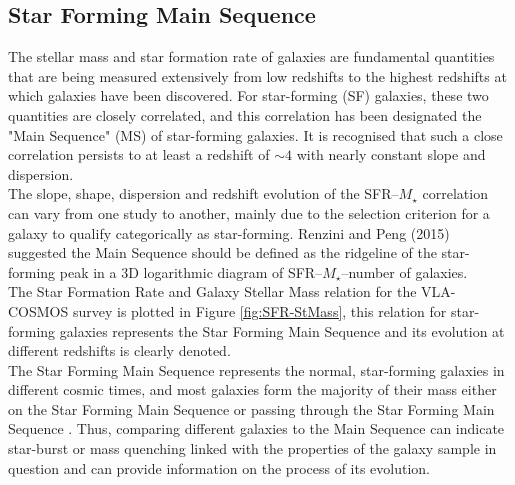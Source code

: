 \subsection*{Star Forming Main Sequence}
The stellar mass and star formation rate of galaxies are fundamental quantities that are being measured extensively from low redshifts to the highest redshifts at which galaxies have been discovered. For star-forming (SF) galaxies, these two quantities are closely correlated\cite{Elbaz2007}, and this correlation has been designated the "Main Sequence" (MS) of star-forming galaxies. It is recognised\cite{Noeske2007} that such a close
correlation persists to at least a redshift of $\sim 4$ with nearly constant slope and dispersion\cite{Speagle2014}. \\
The slope, shape, dispersion and redshift evolution of the SFR–$M_\star$ correlation can vary from one study to another, mainly due to the selection criterion for a galaxy to qualify categorically as star-forming. Renzini and Peng (2015)\cite{Renzini2015} suggested the Main Sequence should be defined as the ridgeline of the star-forming peak in a 3D logarithmic diagram of SFR–$M_\star$–number of galaxies.\\
The Star Formation Rate and Galaxy Stellar Mass relation for the VLA-COSMOS survey is plotted in Figure \ref{fig:SFR-StMass}, this relation for star-forming galaxies represents the Star Forming Main Sequence and its evolution at different redshifts is clearly denoted.\\
The Star Forming Main Sequence represents the normal, star-forming galaxies in different cosmic times, and most galaxies form the majority of their mass either on the Star Forming Main Sequence or passing through the Star Forming Main Sequence \cite{Leja2022}. Thus, comparing different galaxies to the Main Sequence can indicate star-burst or mass quenching linked with the properties of the galaxy sample in question and can provide information on the process of its evolution. 
